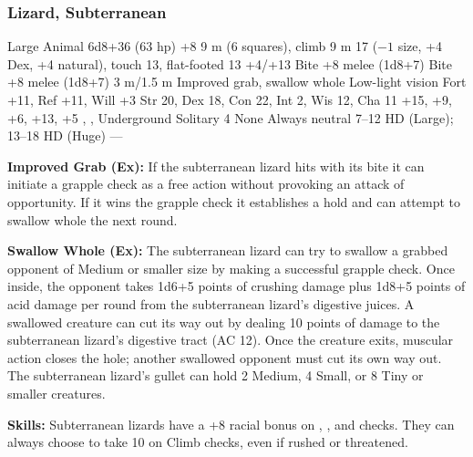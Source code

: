 \subsubsection{Lizard, Subterranean}
\begin{MonsterStats}
{Large Animal}
{6d8+36 (63 hp)}
{+8}
{9 m (6 squares), climb 9 m}
{17 ($-1$ size, +4 Dex, +4 natural), touch 13, flat-footed 13}
{+4/+13}
{Bite +8 melee (1d8+7)}
{Bite +8 melee (1d8+7)}
{3 m/1.5 m}
{Improved grab, swallow whole}
{Low-light vision}
{Fort +11, Ref +11, Will +3}
{Str 20, Dex 18, Con 22, Int 2, Wis 12, Cha 11}
{ +15,  +9,  +6,  +13,  +5}
{, , }
{Underground}
{Solitary}
{4}
{None}
{Always neutral}
{7--12 HD (Large); 13--18 HD (Huge)}
{---}
\end{MonsterStats}

\textbf{Improved Grab (Ex):} If the subterranean lizard hits with its bite it can initiate a grapple check as a free action without provoking an attack of opportunity. If it wins the grapple check it establishes a hold and can attempt to swallow whole the next round.

\textbf{Swallow Whole (Ex):} The subterranean lizard can try to swallow a grabbed opponent of Medium or smaller size by making a successful grapple check. Once inside, the opponent takes 1d6+5 points of crushing damage plus 1d8+5 points of acid damage per round from the subterranean lizard's digestive juices. A swallowed creature can cut its way out by dealing 10 points of damage to the subterranean lizard's digestive tract (AC 12). Once the creature exits, muscular action closes the hole; another swallowed opponent must cut its own way out. The subterranean lizard's gullet can hold 2 Medium, 4 Small, or 8 Tiny or smaller creatures.

\textbf{Skills:} Subterranean lizards have a +8 racial bonus on , , and  checks. They can always choose to take 10 on Climb checks, even if rushed or threatened.
